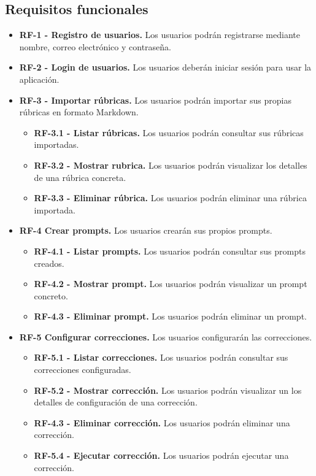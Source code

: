 \subsection{Requisitos funcionales}
\begin{itemize}
    \item \textbf{RF-1 - Registro de usuarios.} Los usuarios podrán registrarse mediante nombre, correo electrónico y contraseña.
    \item \textbf{RF-2 - Login de usuarios.} Los usuarios deberán iniciar sesión para usar la aplicación.
    \item \textbf{RF-3 - Importar rúbricas.} Los usuarios podrán importar sus propias rúbricas en formato Markdown.
    \begin{itemize}
        \item \textbf{RF-3.1 - Listar rúbricas.} Los usuarios podrán consultar sus rúbricas importadas.
        \item \textbf{RF-3.2 - Mostrar rubrica.} Los usuarios podrán visualizar los detalles de una rúbrica concreta.
        \item \textbf{RF-3.3 - Eliminar rúbrica.} Los usuarios podrán eliminar una rúbrica importada.
    \end{itemize}
    \item \textbf{RF-4 Crear prompts.} Los usuarios crearán sus propios prompts.
    \begin{itemize}
        \item \textbf{RF-4.1 - Listar prompts.} Los usuarios podrán consultar sus prompts creados.
        \item \textbf{RF-4.2 - Mostrar prompt.} Los usuarios podrán visualizar un prompt concreto.
        \item \textbf{RF-4.3 - Eliminar prompt.} Los usuarios podrán eliminar un prompt.
    \end{itemize}
    \item \textbf{RF-5 Configurar correcciones.} Los usuarios configurarán las correcciones.
    \begin{itemize}
        \item \textbf{RF-5.1 - Listar correcciones.} Los usuarios podrán consultar sus correcciones configuradas.
        \item \textbf{RF-5.2 - Mostrar corrección.} Los usuarios podrán visualizar un los detalles de configuración de una corrección.
        \item \textbf{RF-4.3 - Eliminar corrección.} Los usuarios podrán eliminar una corrección.
        \item \textbf{RF-5.4 - Ejecutar corrección.} Los usuarios podrán ejecutar una corrección.

\end{itemize}
\end{itemize}
